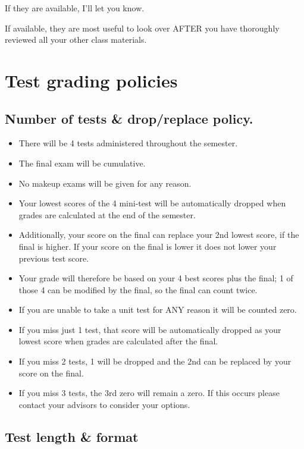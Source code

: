 \documentclass[
]{book}
\providecommand{\tightlist}{%
  \setlength{\itemsep}{0pt}\setlength{\parskip}{0pt}}
\begin{document}
If they are available, I'll let you know.

If available, they are most useful to look over AFTER you have thoroughly reviewed all your other class materials.

\hypertarget{test-grading-policies}{%
\chapter{Test grading policies}\label{test-grading-policies}}

\hypertarget{number-of-tests-dropreplace-policy.}{%
\section{Number of tests \& drop/replace policy.}\label{number-of-tests-dropreplace-policy.}}

\begin{itemize}
\tightlist
\item
  There will be 4 tests administered throughout the semester.
\item
  The final exam will be cumulative.
\item
  No makeup exams will be given for any reason.
\item
  Your lowest scores of the 4 mini-test will be automatically dropped when grades are calculated at the end of the semester.\\
\item
  Additionally, your score on the final can replace your 2nd lowest score, if the final is higher. If your score on the final is lower it does not lower your previous test score.
\item
  Your grade will therefore be based on your 4 best scores plus the final; 1 of those 4 can be modified by the final, so the final can count twice.
\item
  If you are unable to take a unit test for ANY reason it will be counted zero.
\item
  If you miss just 1 test, that score will be automatically dropped as your lowest score when grades are calculated after the final.
\item
  If you miss 2 tests, 1 will be dropped and the 2nd can be replaced by your score on the final.
\item
  If you miss 3 tests, the 3rd zero will remain a zero. If this occurs please contact your advisors to consider your options.
\end{itemize}

\hypertarget{test-length-format}{%
\section{Test length \& format}\label{test-length-format}}
\end{document}
